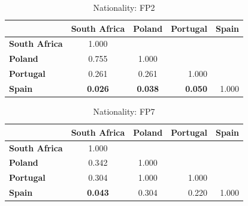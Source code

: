 \begin{table}
    \small
    \centering
    \begin{tabular}{lcccc}
        \toprule
                              & \multicolumn{1}{l}{\textbf{South Africa}} & \multicolumn{1}{l}{\textbf{Poland}}    & \textbf{Portugal}                                          & \textbf{Spain}            \\
        \midrule
        \textbf{South Africa} & 1.000                                     & \multicolumn{1}{l}{}                   &                                                            &                           \\
        \textbf{Poland}       & 0.755                                     & 1.000                                  &                                                            &                           \\
        \textbf{Portugal}     & 0.261                                     & 0.261                                  & \multicolumn{1}{r}{1.000}                                  &                           \\
        \textbf{Spain}        & \cellcolor[HTML]{EFEFEF}\textbf{0.026}    & \cellcolor[HTML]{EFEFEF}\textbf{0.038} & \multicolumn{1}{r}{\cellcolor[HTML]{EFEFEF}\textbf{0.050}} & \multicolumn{1}{r}{1.000} \\
        \bottomrule
    \end{tabular}
    \caption{Nationality: FP2}
\end{table}

\begin{table}
    \small
    \centering
    \begin{tabular}{lcccc}
        \toprule
                              & \multicolumn{1}{l}{\textbf{South Africa}} & \multicolumn{1}{l}{\textbf{Poland}} & \textbf{Portugal}         & \textbf{Spain}            \\
        \midrule
        \textbf{South Africa} & 1.000                                     & \multicolumn{1}{l}{}                &                           &                           \\
        \textbf{Poland}       & 0.342                                     & 1.000                               &                           &                           \\
        \textbf{Portugal}     & 0.304                                     & 1.000                               & \multicolumn{1}{r}{1.000} &                           \\
        \textbf{Spain}        & \cellcolor[HTML]{EFEFEF}\textbf{0.043}    & 0.304                               & \multicolumn{1}{r}{0.220} & \multicolumn{1}{r}{1.000} \\
        \bottomrule
    \end{tabular}
    \caption{Nationality: FP7}
\end{table}

